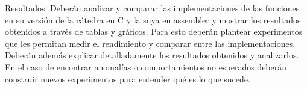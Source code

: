 Resultados: Deberán analizar y comparar las implementaciones de las funciones en su versión de la cátedra en C y la suya en assembler y mostrar los resultados obtenidos a través de tablas y gráficos. Para esto deberán plantear experimentos que les permitan medir el rendimiento y comparar entre las implementaciones. Deberán además explicar detalladamente los resultados obtenidos y analizarlos. En el caso de encontrar anomalías o comportamientos no esperados deberán construir nuevos experimentos para entender qué es lo que sucede.
